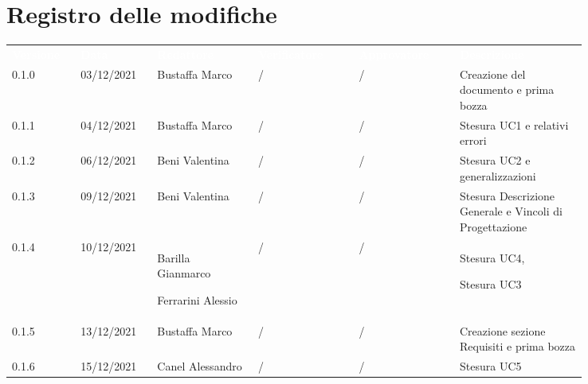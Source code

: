 \section*{Registro delle modifiche}

{\renewcommand{\arraystretch}{1.5}
\scriptsize
\begin{tabular}{p{0.10\linewidth}p{0.10\linewidth}p{0.15\linewidth}p{0.15\linewidth}p{0.15\linewidth}p{0.19\linewidth}}
	\rowcolor[RGB]{33, 73, 50}
	\textcolor{white}{\textbf{Versione}} & \textcolor{white}{\textbf{Data}} & 
	\textcolor{white}{\textbf{Redattore}} & \textcolor{white}{\textbf{Verificatore}} & 
	\textcolor{white}{\textbf{Approvatore}} & \textcolor{white}{\textbf{Descrizione}}\\
	\rowcolor[RGB]{216, 235, 171}
	0.1.0 & 03/12/2021 & Bustaffa Marco& / &/& Creazione del documento e prima bozza\\
	\rowcolor[RGB]{233, 245, 206}
	0.1.1 & 04/12/2021 & Bustaffa Marco& / &/& Stesura UC1 e relativi errori\\
	\rowcolor[RGB]{216, 235, 171}
	0.1.2 & 06/12/2021 & Beni Valentina& / &/& Stesura UC2 e generalizzazioni\\
	\rowcolor[RGB]{233, 245, 206}
	0.1.3 & 09/12/2021 & Beni Valentina& / &/& Stesura Descrizione Generale e Vincoli di Progettazione \\
	\rowcolor[RGB]{216, 235, 171}
	0.1.4 & 10/12/2021 & Barilla Gianmarco \par Ferrarini Alessio& / &/& Stesura UC4, \par Stesura UC3 \\
	\rowcolor[RGB]{233, 245, 206}
	0.1.5 & 13/12/2021 & Bustaffa Marco& / &/& Creazione sezione Requisiti e prima bozza\\
	\rowcolor[RGB]{216, 235, 171}
	0.1.6 & 15/12/2021 & Canel Alessandro& /&/& Stesura UC5\\	
\end{tabular}	
}